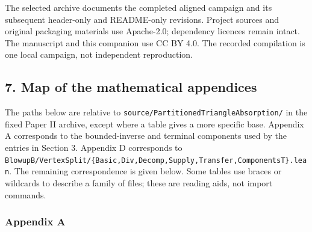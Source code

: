 \documentclass[english,11pt,a4paper]{article}
\begin{document}
The selected archive documents the completed aligned campaign and its subsequent header-only and README-only revisions. Project sources and original packaging materials use Apache-2.0; dependency licences remain intact. The manuscript and this companion use CC BY 4.0. The recorded compilation is one local campaign, not independent reproduction.

\subsection{7. Map of the mathematical appendices}\label{map-of-the-mathematical-appendices}

The paths below are relative to \texttt{source/\allowbreak{}Parti\allowbreak{}tioned\allowbreak{}Triang\allowbreak{}le\allowbreak{}Absorption\allowbreak{}/\allowbreak{}} in the fixed Paper II archive, except where a table gives a more specific base. Appendix A corresponds to the bounded-inverse and terminal components used by the entries in Section 3. Appendix D corresponds to \texttt{Blowup\allowbreak{}B/\allowbreak{}Vert\allowbreak{}ex\allowbreak{}Split/\allowbreak{}\{\allowbreak{}Bas\allowbreak{}ic,\allowbreak{}Div,\allowbreak{}Decom\allowbreak{}p,\allowbreak{}Supply,\allowbreak{}Tra\allowbreak{}nsfer,\allowbreak{}Compon\allowbreak{}ents\allowbreak{}T\}\allowbreak{}.\allowbreak{}lean}. The remaining correspondence is given below. Some tables use braces or wildcards to describe a family of files; these are reading aids, not import commands.

\subsubsection{Appendix A}\label{appendix-a}
\end{document}
